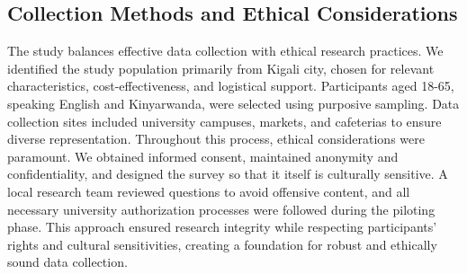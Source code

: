 \documentclass{CSSRforAfrica}
\begin{document}
\subsection{Collection Methods and Ethical Considerations}
 \label{section:ethics}

The study balances effective data collection with ethical research practices. We identified the study population primarily from Kigali city, chosen for relevant characteristics, cost-effectiveness, and logistical support. Participants aged 18-65, speaking English and Kinyarwanda, were selected using purposive sampling. Data collection sites included university campuses, markets, and cafeterias to ensure diverse representation. Throughout this process, ethical considerations were paramount. We obtained informed consent, maintained anonymity and confidentiality, and designed the survey so that it itself is culturally sensitive. A local research team reviewed questions to avoid offensive content, and all necessary university authorization processes were followed during the piloting phase. This approach ensured research integrity while respecting participants' rights and cultural sensitivities, creating a foundation for robust and ethically sound data collection.
\end{document}
